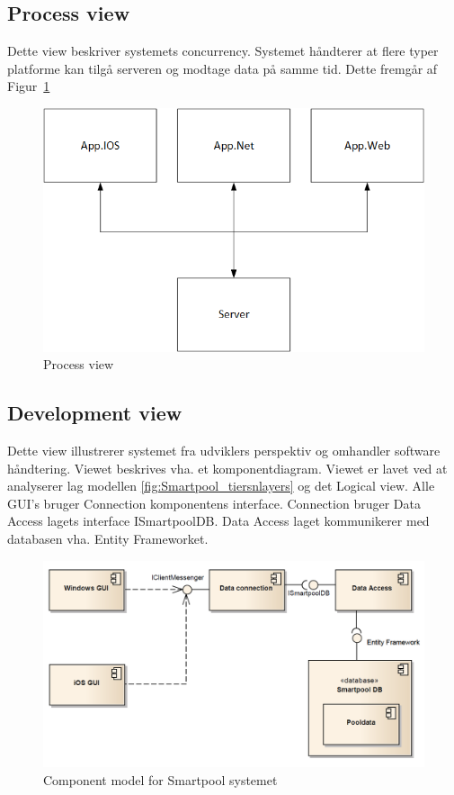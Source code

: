 \subsection{Process view}
Dette view beskriver systemets concurrency. Systemet håndterer at flere typer platforme kan tilgå serveren og modtage data på samme tid. Dette fremgår af Figur~\ref{fig:processview}
\begin{figure}
\centering
\includegraphics[width=0.7\linewidth]{figs/arkitektur/Processview.png}
\caption{Process view}
\label{fig:processview}
\end{figure}

\subsection{Development view}
Dette view illustrerer systemet fra udviklers perspektiv og omhandler software håndtering. Viewet beskrives vha. et komponentdiagram. Viewet er lavet ved at analyserer lag modellen \ref{fig:Smartpool_tiersnlayers} og det Logical view. Alle GUI's bruger Connection komponentens interface. Connection bruger Data Access lagets interface ISmartpoolDB. Data Access laget kommunikerer med databasen vha. Entity Frameworket.

\begin{figure}
\centering
\includegraphics[width=0.7\linewidth]{figs/arkitektur/componentModel}
\caption{Component model for Smartpool systemet}
\label{fig:componentModel}
\end{figure}

